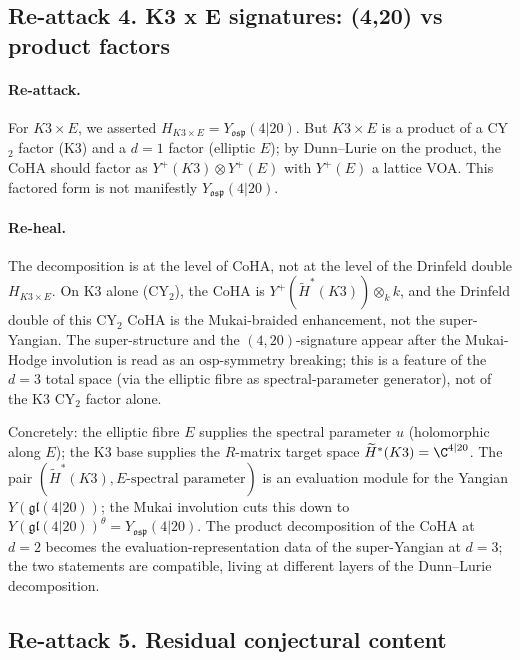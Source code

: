 \subsection*{Re-attack 4.  K3 x E signatures: (4,20) vs product factors}

\paragraph{Re-attack.}  For $K3 \times E$, we asserted
$H_{K3 \times E} = Y_{\mathfrak{osp}}(4|20)$.  But $K3 \times E$ is a
product of a CY$_2$ factor (K3) and a $d=1$ factor (elliptic $E$); by
Dunn--Lurie on the product, the CoHA should factor as
$Y^+(K3) \otimes Y^+(E)$ with $Y^+(E)$ a lattice VOA.  This factored
form is not manifestly $Y_{\mathfrak{osp}}(4|20)$.

\paragraph{Re-heal.}  The decomposition is at the level of
$\mathrm{CoHA}$, not at the level of the Drinfeld double $H_{K3 \times E}$.
On K3 alone (CY$_2$), the CoHA is
$Y^+(\widetilde H^*(K3)) \otimes_k k$, and the Drinfeld double of
this CY$_2$ CoHA is the Mukai-braided enhancement, not the super-Yangian.
The super-structure and the $(4, 20)$-signature appear after the
Mukai-Hodge involution is read as an $\mathrm{osp}$-symmetry breaking;
this is a feature of the $d = 3$ total space (via the elliptic fibre
as spectral-parameter generator), not of the K3 CY$_2$ factor alone.

Concretely: the elliptic fibre $E$ supplies the spectral parameter $u$
(holomorphic along $E$); the K3 base supplies the $R$-matrix target
space $\widetilde H^*(K3) = \C^{4|20}$.  The pair
$(\widetilde H^*(K3), E\text{-spectral parameter})$ is an evaluation
module for the Yangian $Y(\mathfrak{gl}(4|20))$; the Mukai involution
cuts this down to $Y(\mathfrak{gl}(4|20))^\theta = Y_{\mathfrak{osp}}
(4|20)$.  The product decomposition of the CoHA at $d = 2$ becomes
the evaluation-representation data of the super-Yangian at $d = 3$;
the two statements are compatible, living at different layers of the
Dunn--Lurie decomposition.


\subsection*{Re-attack 5.  Residual conjectural content}

